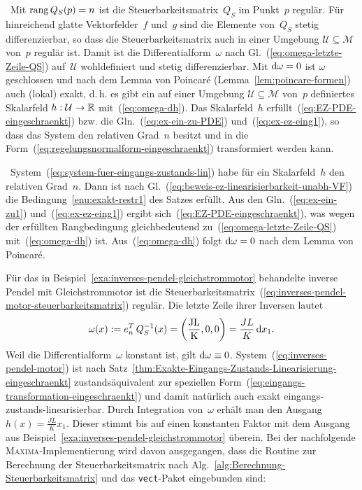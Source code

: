 \begin{svmultproof2}
\notwendig\ Mit ${\operatorname{rang}}\,Q_{S}(p)=n$ ist die Steuerbarkeitsmatrix~$Q_{S}$
im Punkt~$p$ regulär. Für hinreichend glatte Vektorfelder~$f$
und~$g$ sind die Elemente von~$Q_{S}$ stetig differenzierbar,
so dass die Steuerbarkeitsmatrix auch in einer Umgebung $\mathcal{U}\subseteq\mathcal{M}$
von~$p$ regulär ist. Damit ist die Differentialform~$\omega$ nach
Gl.~(\ref{eq:omega-letzte-Zeile-QS}) auf~$\mathcal{U}$ wohldefiniert
und stetig differenzierbar. Mit ${\mathrm{d}}\omega=0$ ist $\omega$ geschlossen
und nach dem Lemma von Poincaré (Lemma~\ref{lem:poincare-formen})
auch (lokal) exakt, d.\,h. es gibt ein auf einer Umgebung $\mathcal{U}\subseteq\mathcal{M}$
von~$p$ definiertes Skalarfeld $h:\mathcal{U}\to{\mathbb{R}}$ mit~(\ref{eq:omega-dh}).
Das Skalarfeld~$h$ erfüllt~(\ref{eq:EZ-PDE-eingeschraenkt}) bzw.
die Gln.~(\ref{eq:ex-ein-zu-PDE}) und~(\ref{eq:ex-ez-eing1}),
so dass das System den relativen Grad~$n$ besitzt und in die Form~(\ref{eq:regelungsnormalform-eingeschraenkt})
transformiert werden kann.

\hinreichend\ System~(\ref{eq:system-fuer-eingangs-zustands-lin})
habe für ein Skalarfeld~$h$ den relativen Grad~$n$. Dann ist nach
Gl.~(\ref{eq:beweis-ez-linearisierbarkeit-unabh-VF}) die Bedingung~\ref{enu:exakt-restr1}
des Satzes erfüllt. Aus den Gln.~(\ref{eq:ex-ein-zu1}) und~(\ref{eq:ex-ez-eing1})
ergibt sich~(\ref{eq:EZ-PDE-eingeschraenkt}), was wegen der erfüllten
Rangbedingung gleichbedeutend zu~(\ref{eq:omega-letzte-Zeile-QS})
mit~(\ref{eq:omega-dh}) ist. Aus~(\ref{eq:omega-dh}) folgt ${\mathrm{d}}\omega=0$
nach dem Lemma von Poincaré.
\end{svmultproof2}

\begin{example}
\label{exa:inverses-pendel-gleichstrommotor-formen}Für das in Beispiel~\ref{exa:inverses-pendel-gleichstrommotor}
behandelte inverse Pendel mit Gleichstrommotor ist die Steuerbarkeitsmatrix~(\ref{eq:inverses-pendel-motor-steuerbarkeitsmatrix})
regulär. Die letzte Zeile ihrer Inversen lautet
\[
\omega(x):=e_{n}^{T}\,Q_{S}^{-1}(x)=\left(\unit{\frac{JL}{K}},0,0\right)=\frac{JL}{K}\,\d x_{1}.
\]
Weil die Differentialform~$\omega$ konstant ist, gilt ${\mathrm{d}}\omega\equiv0$.
System~(\ref{eq:inverses-pendel-motor}) ist nach Satz~\ref{thm:Exakte-Eingangs-Zustands-Linearisierung-eingeschraenkt}
zustands\-äquivalent zur speziellen Form~(\ref{eq:eingangs-transformation-eingeschraenkt})
und damit natürlich auch exakt eingangs-zustands-linearisierbar. Durch
Integration von~$\omega$ erhält man den Ausgang $h(x)=\tfrac{JL}{K}x_{1}$.
Dieser stimmt bis auf einen konstanten Faktor mit dem Ausgang aus
Beispiel~\ref{exa:inverses-pendel-gleichstrommotor} überein. Bei
der nachfolgende \textsc{Maxima}-Implementierung wird davon ausgegangen,
dass die Routine zur Berechnung der Steuerbarkeitsmatrix nach Alg.~\ref{alg:Berechnung-Steuerbarkeitsmatrix}
und das \texttt{vect}-Paket eingebunden sind:

\begin{maxima}\end{maxima}
\end{example}

